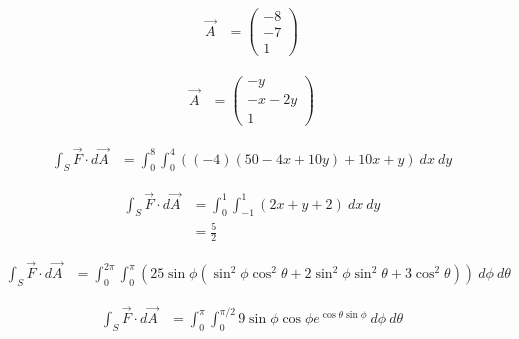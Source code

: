 \documentclass[10pt]{extarticle}
\begin{document}
  \begin{problem}{19.2}
    \begin{description}[font=\normalfont]
      \item[2:]
        \begin{align*}
          \vec{A} &= \begin{pmatrix}-8\\-7\\1\end{pmatrix}
        \end{align*}
      \item[4:]
        \begin{align*}
          \vec{A} &= \begin{pmatrix}-y\\-x-2y\\1\end{pmatrix}
        \end{align*}
      \item[6:]
        \begin{align*}
          \int_{S}\vec{F}\cdot d\vec{A} &= \int_{0}^{8}\int_{0}^{4} \left((-4)(50-4x+10y) + 10x +y\right)~dx~dy
        \end{align*}
      \item[12:]
        \begin{align*}
          \int_{S}\vec{F} \cdot d\vec{A} &= \int_{0}^{1}\int_{-1}^{1}(2x + y + 2)~dx~dy\\
                                         &= \frac{5}{2}
        \end{align*}
      \item[16:] 
      \item[18:] 
      \item[20:]
      \item[22:]
        \begin{align*}
          \int_{S} \vec{F} \cdot d\vec{A} &= \int_{0}^{2\pi}\int_{0}^{\pi}\left(25\sin\phi(\sin^2\phi\cos^2\theta + 2\sin^2\phi\sin^2\theta + 3\cos^2\theta)\right)~d\phi~d\theta
        \end{align*}
      \item[24:]
        \begin{align*}
          \int_{S} \vec{F} \cdot d\vec{A} &= \int_{0}^{\pi}\int_{0}^{\pi/2}9\sin\phi\cos\phi e^{\cos\theta\sin\phi}~d\phi~d\theta
        \end{align*}
    \end{description}
  \end{problem}
\end{document}
